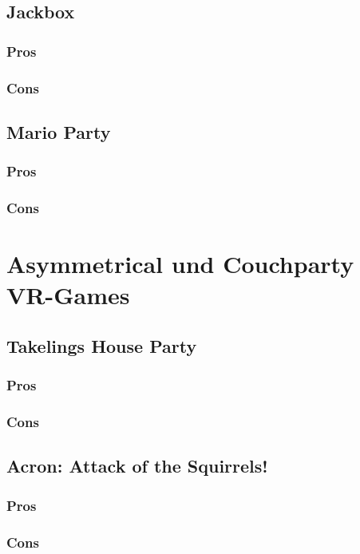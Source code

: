 \subsection{Jackbox}

\subsubsection{Pros}

\subsubsection{Cons}

\subsection{Mario Party}

\subsubsection{Pros}

\subsubsection{Cons}

\section{Asymmetrical und Couchparty VR-Games}

\subsection{Takelings House Party}

\subsubsection{Pros}

\subsubsection{Cons}

\subsection{Acron: Attack of the Squirrels!}

\subsubsection{Pros}

\subsubsection{Cons}